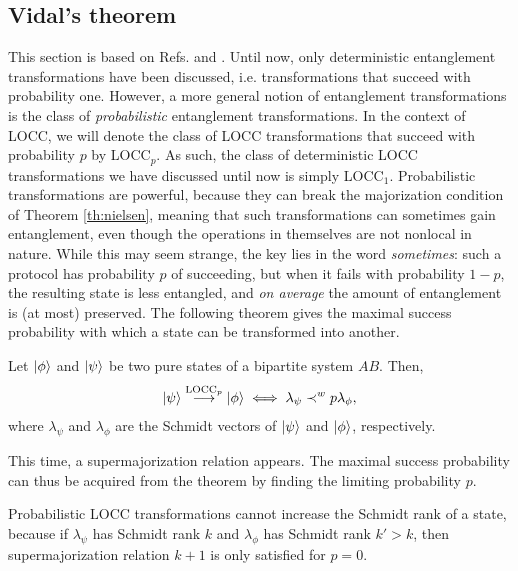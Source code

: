 \subsection{Vidal's theorem} \label{sec:vidal}

This section is based on Refs. \cite{vidal_entanglement_1999} and \cite{nielsen_majorization_2001}. Until now, only deterministic entanglement transformations have been discussed, i.e. transformations that succeed with probability one. However, a more general notion of entanglement transformations is the class of \textit{probabilistic} entanglement transformations. In the context of LOCC, we will denote the class of LOCC transformations that succeed with probability $p$ by LOCC$_p$. As such, the class of deterministic LOCC transformations we have discussed until now is simply LOCC$_1$. Probabilistic transformations are powerful, because they can break the majorization condition of Theorem \ref{th:nielsen}, meaning that such transformations can sometimes gain entanglement, even though the operations in themselves are not nonlocal in nature. While this may seem strange, the key lies in the word \textit{sometimes}: such a protocol has probability $p$ of succeeding, but when it fails with probability $1-p$, the resulting state is less entangled, and \textit{on average} the amount of entanglement is (at most) preserved. The following theorem gives the maximal success probability with which a state can be transformed into another.

\begin{appendix_theorem} \label{th:vidal}
    Let $\ket{\phi}$ and $\ket{\psi}$ be two pure states of a bipartite system $AB$. Then,
    \begin{equation}
        \ket{\psi} \overset{\text{LOCC}_p}{\longrightarrow} \ket{\phi} \iff \lambda_\psi \prec^w p \lambda_\phi,
    \end{equation}
    where $\lambda_\psi$ and $\lambda_\phi$ are the Schmidt vectors of $\ket{\psi}$ and $\ket{\phi}$, respectively.
\end{appendix_theorem}


\noindent This time, a supermajorization relation appears. The maximal success probability can thus be acquired from the theorem by finding the limiting probability $p$. 

\begin{appendix_corollary}
    Probabilistic LOCC transformations cannot increase the Schmidt rank of a state, because if $\lambda_\psi$ has Schmidt rank $k$ and $\lambda_\phi$ has Schmidt rank $k' > k$, then supermajorization relation $k+1$ is only satisfied for $p=0$.
\end{appendix_corollary}





